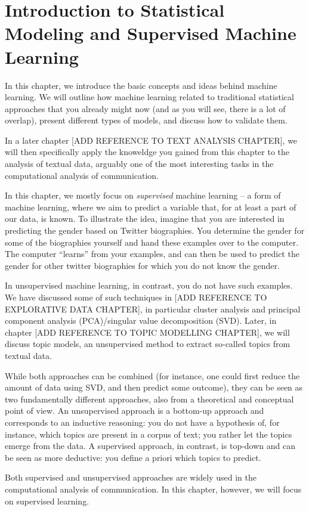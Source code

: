\chapter{Introduction to Statistical Modeling and Supervised Machine Learning}

In this chapter, we introduce the basic concepts and ideas behind machine learning.
We will outline how machine learning related to traditional statistical approaches that you already might now (and as you will see, there is a lot of overlap), present different types of models, and discuss how to validate them.

In a later chapter [ADD REFERENCE TO TEXT ANALYSIS CHAPTER], we will then specifically apply the knoweldge you gained from this chapter to the analysis of textual data, arguably one of the most interesting tasks in the computational analysis of communication.

In this chapter, we mostly focus on \emph{supervised} machine learning -- a form of machine learning, where we aim to predict a variable that, for at least a part of our data, is known. To illustrate the idea, imagine that you are interested in predicting the gender based on Twitter biographies. You determine the gender for some of the biographies yourself and hand these examples over to the computer. The computer ``learns'' from your examples, and can then be used to predict the gender for other twitter biographies for which you do not know the gender.

In unsupervised machine learning, in contrast, you do not have such examples. We have discussed some of such techniques in [ADD REFERENCE TO EXPLORATIVE DATA CHAPTER], in particular cluster analysis and principal component analysis (PCA)/singular value decomposition (SVD).
Later, in chapter [ADD REFERENCE TO TOPIC MODELLING CHAPTER], we will discuss topic models, an unsupervised method to extract so-called topics from textual data.

While both approaches can be combined (for instance, one could first reduce the amount of data using SVD, and then predict some outcome), they can be seen as two fundamentally different approaches, also from a theoretical and conceptual point of view. An unsupervised approach is a bottom-up approach and corresponds to an inductive reasoning: you do not have a hypothesis of, for instance, which topics are present in a corpus of text; you rather let the topics emerge from the data.
A supervised approach, in contrast, is top-down and can be seen as more deductive: you define a priori which topics to predict.

Both supervised and unsupervised approaches are widely used in the computational analysis of communication.
In this chapter, however, we will focus on supervised learning.









